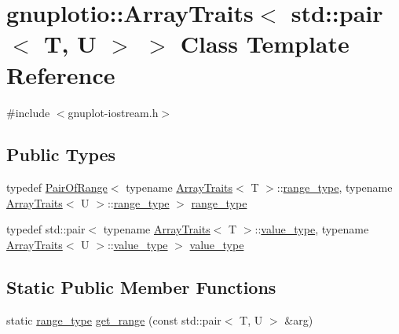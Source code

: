 \hypertarget{classgnuplotio_1_1_array_traits_3_01std_1_1pair_3_01_t_00_01_u_01_4_01_4}{}\section{gnuplotio\+:\+:Array\+Traits$<$ std\+:\+:pair$<$ T, U $>$ $>$ Class Template Reference}
\label{classgnuplotio_1_1_array_traits_3_01std_1_1pair_3_01_t_00_01_u_01_4_01_4}


{\ttfamily \#include $<$gnuplot-\/iostream.\+h$>$}

\subsection*{Public Types}
\begin{DoxyCompactItemize}
\item 
typedef \hyperlink{classgnuplotio_1_1_pair_of_range}{Pair\+Of\+Range}$<$ typename \hyperlink{classgnuplotio_1_1_array_traits}{Array\+Traits}$<$ T $>$\+::\hyperlink{classgnuplotio_1_1_array_traits_3_01std_1_1pair_3_01_t_00_01_u_01_4_01_4_a80b3c6c794a51c78f0c645e5e4c19afc}{range\+\_\+type}, typename \hyperlink{classgnuplotio_1_1_array_traits}{Array\+Traits}$<$ U $>$\+::\hyperlink{classgnuplotio_1_1_array_traits_3_01std_1_1pair_3_01_t_00_01_u_01_4_01_4_a80b3c6c794a51c78f0c645e5e4c19afc}{range\+\_\+type} $>$ \hyperlink{classgnuplotio_1_1_array_traits_3_01std_1_1pair_3_01_t_00_01_u_01_4_01_4_a80b3c6c794a51c78f0c645e5e4c19afc}{range\+\_\+type}
\item 
typedef std\+::pair$<$ typename \hyperlink{classgnuplotio_1_1_array_traits}{Array\+Traits}$<$ T $>$\+::\hyperlink{classgnuplotio_1_1_array_traits_3_01std_1_1pair_3_01_t_00_01_u_01_4_01_4_a143ab4d4cf6693d33e46fa41d3265aab}{value\+\_\+type}, typename \hyperlink{classgnuplotio_1_1_array_traits}{Array\+Traits}$<$ U $>$\+::\hyperlink{classgnuplotio_1_1_array_traits_3_01std_1_1pair_3_01_t_00_01_u_01_4_01_4_a143ab4d4cf6693d33e46fa41d3265aab}{value\+\_\+type} $>$ \hyperlink{classgnuplotio_1_1_array_traits_3_01std_1_1pair_3_01_t_00_01_u_01_4_01_4_a143ab4d4cf6693d33e46fa41d3265aab}{value\+\_\+type}
\end{DoxyCompactItemize}
\subsection*{Static Public Member Functions}
\begin{DoxyCompactItemize}
\item 
static \hyperlink{classgnuplotio_1_1_array_traits_3_01std_1_1pair_3_01_t_00_01_u_01_4_01_4_a80b3c6c794a51c78f0c645e5e4c19afc}{range\+\_\+type} \hyperlink{classgnuplotio_1_1_array_traits_3_01std_1_1pair_3_01_t_00_01_u_01_4_01_4_abc84b60061de787f3526163183e186f7}{get\+\_\+range} (const std\+::pair$<$ T, U $>$ \&arg)
\end{DoxyCompactItemize}
